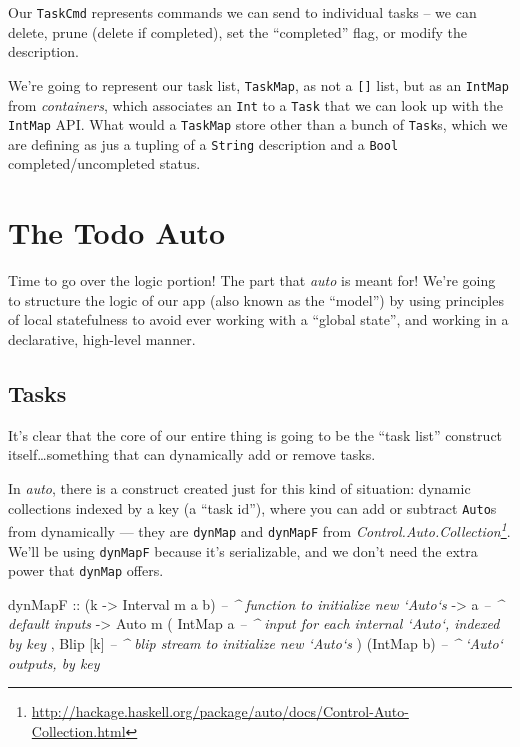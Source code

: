 \documentclass[]{article}
\newenvironment{Shaded}{}{}
\newcommand{\DataTypeTok}[1]{\textcolor[rgb]{0.56,0.13,0.00}{{#1}}}
\newcommand{\CommentTok}[1]{\textcolor[rgb]{0.38,0.63,0.69}{\textit{{#1}}}}
\newcommand{\OtherTok}[1]{\textcolor[rgb]{0.00,0.44,0.13}{{#1}}}
\newcommand{\NormalTok}[1]{{#1}}
\renewcommand{\href}[2]{#2\footnote{\url{#1}}}
\begin{document}
Our \texttt{TaskCmd} represents commands we can send to individual tasks -- we
can delete, prune (delete if completed), set the ``completed'' flag, or modify
the description.

We're going to represent our task list, \texttt{TaskMap}, as not a
\texttt{{[}{]}} list, but as an \texttt{IntMap} from \emph{containers}, which
associates an \texttt{Int} to a \texttt{Task} that we can look up with the
\texttt{IntMap} API. What would a \texttt{TaskMap} store other than a bunch of
\texttt{Task}s, which we are defining as jus a tupling of a \texttt{String}
description and a \texttt{Bool} completed/uncompleted status.

\section{The Todo Auto}\label{the-todo-auto}

Time to go over the logic portion! The part that \emph{auto} is meant for! We're
going to structure the logic of our app (also known as the ``model'') by using
principles of local statefulness to avoid ever working with a ``global state'',
and working in a declarative, high-level manner.

\subsection{Tasks}\label{tasks}

It's clear that the core of our entire thing is going to be the ``task list''
construct itself\ldots{}something that can dynamically add or remove tasks.

In \emph{auto}, there is a construct created just for this kind of situation:
dynamic collections indexed by a key (a ``task id''), where you can add or
subtract \texttt{Auto}s from dynamically --- they are \texttt{dynMap} and
\texttt{dynMapF} from
\emph{\href{http://hackage.haskell.org/package/auto/docs/Control-Auto-Collection.html}{Control.Auto.Collection}}.
We'll be using \texttt{dynMapF} because it's serializable, and we don't need the
extra power that \texttt{dynMap} offers.

\begin{Shaded}
\begin{Highlighting}[]
\OtherTok{dynMapF ::} \NormalTok{(k }\OtherTok{->} \DataTypeTok{Interval} \NormalTok{m a b)    }\CommentTok{-- ^ function to initialize new `Auto`s}
        \OtherTok{->} \NormalTok{a                        }\CommentTok{-- ^ default inputs}
        \OtherTok{->} \DataTypeTok{Auto} \NormalTok{m ( }\DataTypeTok{IntMap} \NormalTok{a        }\CommentTok{-- ^ input for each internal `Auto`, indexed by key}
                  \NormalTok{, }\DataTypeTok{Blip} \NormalTok{[k]        }\CommentTok{-- ^ blip stream to initialize new `Auto`s}
                  \NormalTok{)}
                  \NormalTok{(}\DataTypeTok{IntMap} \NormalTok{b)        }\CommentTok{-- ^ `Auto` outputs, by key}
\end{Highlighting}
\end{Shaded}
\end{document}
